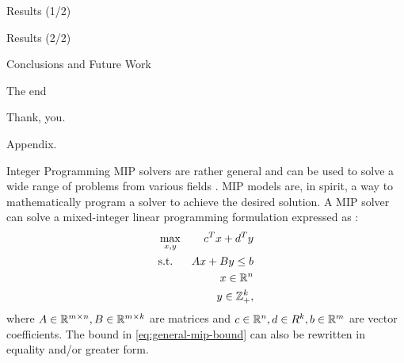 \begin{frame}{Results (1/2)}

\end{frame}

\begin{frame}{Results (2/2)}

\end{frame}

\begin{frame}{Conclusions and Future Work}
	\cite{jepsen2014}
\end{frame}

\begin{frame}{The end}
	\begin{center}
		\begingroup
		\fontsize{18pt}{18pt}\selectfont
		Thank, you.
		\endgroup
	\end{center}
\end{frame}

\appendix

\begin{frame}
\end{frame}

\begin{frame}
	\begin{center}
		\begingroup
		\fontsize{18pt}{18pt}\selectfont
		Appendix.
		\endgroup
	\end{center}
\end{frame}

\begin{frame}{Integer Programming}
	MIP solvers are rather general and can be used to solve a wide range of problems from various fields \parencite{bixby2007progress}.
	MIP models are, in spirit, a way to mathematically program a solver to achieve the desired solution.
	A MIP solver can solve a mixed-integer linear programming formulation
	expressed as \parencite{wolsey1999integer}:
	\begin{align}
		 & \max_{x, y} & c^T x + d^T y                                 \\
		 & \text{s.t.} & A x + B y \le b  \label{eq:general-mip-bound} \\
		 &             & x \in \mathbb R^n                                    \\
		 &             & y \in \mathbb Z_{+}^k,
	\end{align}
	where $A \in \mathbb R^{m \times n}, B \in \mathbb R^{m \times k}$ are matrices and
	$c \in \mathbb R^n, d \in R^k, b \in \mathbb R^m$ are vector coefficients.
	The bound in \cref{eq:general-mip-bound} can also be rewritten in equality and/or greater form.

\end{frame}
